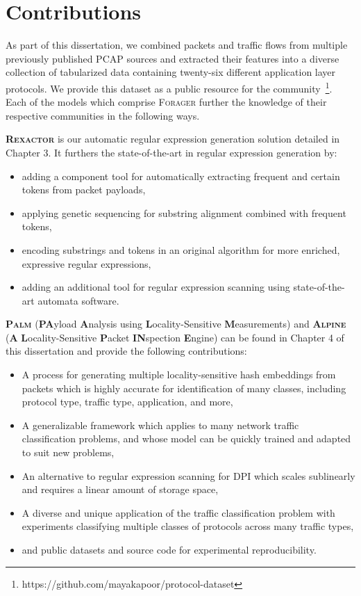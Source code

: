 \section{Contributions}

As part of this dissertation, we combined packets and traffic flows from multiple previously published PCAP sources and extracted their features into a diverse collection of tabularized data containing twenty-six different application layer protocols. We provide this dataset as a public resource for the community~\footnote{https://github.com/mayakapoor/protocol-dataset}. Each of the models which comprise \textsc{Forager} further the knowledge of their respective communities in the following ways.

\textbf{\textsc{Rexactor}} is our automatic regular expression generation solution detailed in Chapter 3. It furthers the state-of-the-art in regular expression generation by:

\begin{itemize}
\item adding a component tool for automatically extracting frequent and certain tokens from packet payloads,
\item applying genetic sequencing for substring alignment combined with frequent tokens,
\item encoding substrings and tokens in an original algorithm for more enriched, expressive regular expressions,
\item adding an additional tool for regular expression scanning using state-of-the-art automata software. \end{itemize}

\textbf{\textsc{Palm}} (\textbf{PA}yload \textbf{A}nalysis using \textbf{L}ocality-Sensitive \textbf{M}easurements) and \textbf{\textsc{Alpine}} (\textbf{A} \textbf{L}ocality-Sensitive \textbf{P}acket \textbf{IN}spection \textbf{E}ngine) can be found in Chapter 4 of this dissertation and provide the following contributions:

\begin{itemize}
\item A process for generating multiple locality-sensitive hash embeddings from packets which is highly accurate for identification of many classes, including protocol type, traffic type, application, and more,
\item A generalizable framework which applies to many network traffic classification problems, and whose model can be quickly trained and adapted to suit new problems,
\item An alternative to regular expression scanning for DPI which scales sublinearly and requires a linear amount of storage space,
\item A diverse and unique application of the traffic classification problem with experiments classifying multiple classes of protocols across many traffic types,
\item and public datasets and source code for experimental reproducibility.
\end{itemize}

